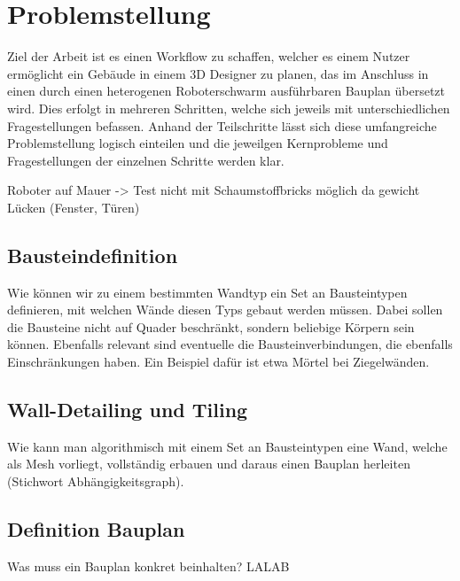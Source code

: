 \chapter{Problemstellung}\label{problem}
Ziel der Arbeit ist es einen Workflow zu schaffen, welcher es einem Nutzer ermöglicht ein Gebäude in einem 3D Designer zu planen, das im Anschluss in einen durch einen heterogenen Roboterschwarm ausführbaren Bauplan übersetzt wird.
Dies erfolgt in mehreren Schritten, welche sich jeweils mit unterschiedlichen Fragestellungen befassen.
Anhand der Teilschritte lässt sich diese umfangreiche Problemstellung logisch einteilen und die jeweilgen Kernprobleme und Fragestellungen der einzelnen Schritte werden klar.


Roboter auf Mauer -> Test nicht mit Schaumstoffbricks möglich da gewicht
Lücken (Fenster, Türen)

\section{Bausteindefinition}
Wie können wir zu einem bestimmten Wandtyp ein Set an Bausteintypen definieren, mit welchen Wände diesen Typs gebaut werden müssen.
Dabei sollen die Bausteine nicht auf Quader beschränkt, sondern beliebige Körpern sein können.
Ebenfalls relevant sind eventuelle die Bausteinverbindungen, die ebenfalls Einschränkungen haben.
Ein Beispiel dafür ist etwa Mörtel bei Ziegelwänden.

\section{Wall-Detailing und Tiling}
Wie kann man algorithmisch mit einem Set an Bausteintypen eine Wand, welche als Mesh vorliegt, vollständig erbauen und daraus einen Bauplan herleiten (Stichwort Abhängigkeitsgraph).

\section{Definition Bauplan}
Was muss ein Bauplan konkret beinhalten?
LALAB